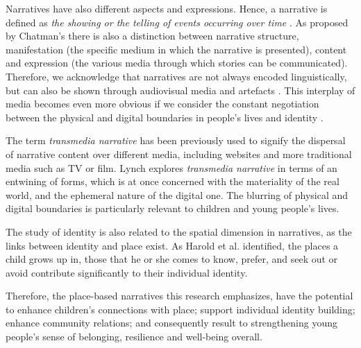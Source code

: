 \documentclass[acmlarge,screen,dvipsnames]{acmart}
\begin{document}
Narratives have also different aspects and expressions. Hence, a narrative is defined as \emph{the showing or the telling of events occurring over time} \cite{10.2307/1343711}. As proposed by Chatman's \cite{10.2307/468421} there is also a distinction between narrative structure, manifestation (the specific medium in which the narrative is presented), content and expression (the various media through which stories can be communicated). Therefore, we acknowledge that narratives are not always encoded linguistically, but can also be shown through audiovisual media and artefacts \cite{PAHL2004339}. This interplay of media becomes even more obvious if we consider the constant negotiation between the physical and digital boundaries in people’s lives and identity \cite{Jordan2009}. 

The term \emph{transmedia narrative} has been previously used to signify the dispersal of narrative content over different media, including websites and more traditional media such as TV or film. Lynch \cite{quteprints107048} explores \emph{transmedia narrative} in terms of an entwining of forms, which is at once concerned with the materiality of the real world, and the ephemeral nature of the digital one. The blurring of physical and digital boundaries is particularly relevant to children and young people's lives.

The study of identity is also related to the spatial dimension in narratives, as the links between identity and place exist. As Harold et al. \cite{PROSHANSKY198357} identified, the places a child grows up in, those that he or she comes to know, prefer, and seek out or avoid contribute significantly to their individual identity.

Therefore, the place-based narratives this research emphasizes, have the potential to enhance children's connections with place; support individual identity building; enhance community relations; and consequently result to strengthening young people's sense of belonging, resilience and well-being overall.
\end{document}
